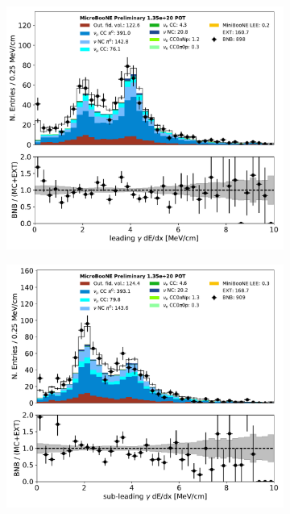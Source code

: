 \documentclass[a4paper]{article}
\begin{document}
\begin{figure}[H] 
\begin{center}
    \begin{subfigure}[b]{0.38\textwidth}
    \centering
    \includegraphics[width=1.00\textwidth]{pi0/pi0_dedx1_fit_Y_01152020_scaled_RUN1.pdf}
    \end{subfigure}
    \begin{subfigure}[b]{0.38\textwidth}
    \centering
    \includegraphics[width=1.00\textwidth]{pi0/pi0_dedx2_fit_Y_01152020_scaled_RUN1.pdf}
    \end{subfigure}
    

\end{center}
\end{figure}
\end{document}

